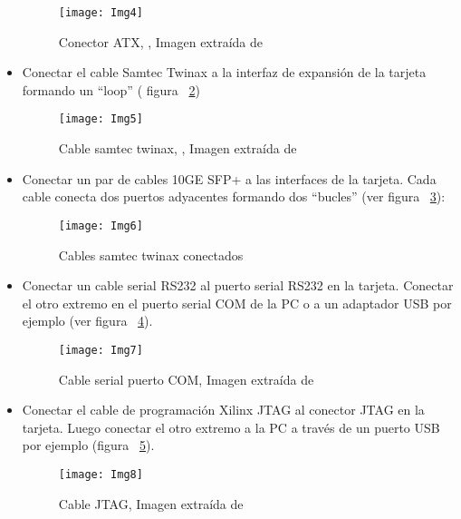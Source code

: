 \begin{itemize}
\begin{figure}[htbp!] 
\centering    
\texttt{[image: Img4]}
\caption[Conector ATX]{Conector ATX, , Imagen extra\'ida de \citep{NetFPGA6}}
\label{fig:Img4}
\end{figure}

\item Conectar el cable Samtec Twinax a la interfaz de expansión de la tarjeta formando un “loop” ( figura ~\ref{fig:Img5})

\begin{figure}[h!] 
\centering    
\texttt{[image: Img5]}
\caption[Cable samtec twinax]{Cable samtec twinax, , Imagen extra\'ida de \citep{NetFPGA6}}
\label{fig:Img5}
\end{figure}

\item Conectar un par de cables 10GE SFP+ a las interfaces de la tarjeta. Cada cable conecta dos puertos adyacentes formando dos “bucles” (ver figura ~\ref{fig:Img6}):

\begin{figure}[h!] 
\centering    
\texttt{[image: Img6]}
\caption[Cables samtec twinax conectados]{Cables samtec twinax conectados}
\label{fig:Img6}
\end{figure}

\item Conectar un cable serial RS232 al puerto serial RS232 en la tarjeta. Conectar el otro extremo en el puerto serial COM de la PC o a un adaptador USB por ejemplo (ver figura ~\ref{fig:Img7}).

\begin{figure}[h!] 
\centering    
\texttt{[image: Img7]}
\caption[Cable serial puerto COM]{Cable serial puerto COM, Imagen extra\'ida de \citep{NetFPGA6}}
\label{fig:Img7}
\end{figure}

\item Conectar el cable de programación Xilinx JTAG al conector JTAG en la tarjeta. Luego conectar el otro extremo a la PC a través de un puerto USB por ejemplo (figura ~\ref{fig:Img8}).

\begin{figure}[h!] 
\centering    
\texttt{[image: Img8]}
\caption[Cable JTAG]{Cable JTAG, Imagen extra\'ida de \citep{NetFPGA6}}
\label{fig:Img8}
\end{figure}

\end{itemize}


